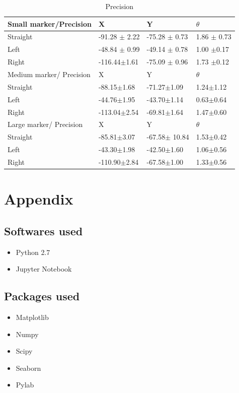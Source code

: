 \documentclass[11pt,a4paper]{article}
\begin{document}
				\begin{table}[h]
					\centering
					\caption{Precision}
					\label{precision}
					\begin{tabular}{|l|l|l|l|}
						\hline
						Small marker/Precision   & X       & Y       & $\theta$ \\ \hline
						Straight                & -91.28 $\pm$ 2.22 & -75.28 $\pm$ 0.73 & 1.86 $\pm$ 0.73  \\ \hline
						Left                    & -48.84 $\pm$ 0.99 & -49.14 $\pm$ 0.78 & 1.00 $\pm$0.17    \\ \hline
						Right                   & -116.44$\pm$1.61 & -75.09 $\pm$ 0.96 & 1.73 $\pm$0.12      \\ \hline
						Medium marker/ Precision & X       & Y       & $\theta$ \\ \hline
						Straight                & -88.15$\pm$1.68 & -71.27$\pm$1.09  & 1.24$\pm$1.12      \\ \hline
						Left                    & -44.76$\pm$1.95  & -43.70$\pm$1.14  & 0.63$\pm$0.64      \\ \hline
						Right                   & -113.04$\pm$2.54 & -69.81$\pm$1.64  & 1.47$\pm$0.60      \\ \hline
						Large marker/ Precision  & X       & Y       & $\theta$ \\ \hline
						Straight                & -85.81$\pm$3.07  & -67.58$\pm$ 10.84  & 1.53$\pm$0.42    \\ \hline
						Left                    & -43.30$\pm$1.98  & -42.50$\pm$1.60  & 1.06$\pm$0.56    \\ \hline
						Right                   & -110.90$\pm$2.84  & -67.58$\pm$1.00  & 1.33$\pm$0.56      \\ \hline
					\end{tabular}
				\end{table}
				\newpage
				\section{Appendix}
				\subsection{Softwares used}
				\begin{itemize}
					\item Python 2.7
					\item Jupyter Notebook
				\end{itemize}
				
				\subsection{Packages used}
				\begin{itemize}
					\item Matplotlib
					\item Numpy
					\item Scipy
					\item Seaborn
					\item Pylab
				\end{itemize}
				
\end{document}
